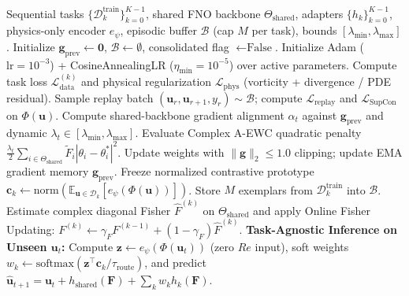 \documentclass[11pt,a4paper]{article}
\begin{document}
\begin{algorithm}[!htbp]
\caption{MEWC-Flow Continual Learning \& Task-Agnostic Inference}
\label{alg:mewcflow}
\begin{algorithmic}[1]
\REQUIRE Sequential tasks $\{\mathcal{D}_k^{\text{train}}\}_{k=0}^{K-1}$, shared FNO backbone $\Theta_{\text{shared}}$, adapters $\{h_k\}_{k=0}^{K-1}$, physics-only encoder $e_{\psi}$, episodic buffer $\mathcal{B}$ (cap $M$ per task), bounds $[\lambda_{\min}, \lambda_{\max}]$.
\STATE Initialize $\mathbf{g}_{\text{prev}} \gets \mathbf{0}$, $\mathcal{B} \gets \emptyset$, consolidated flag $\gets \text{False}$.
  \STATE Initialize Adam ($\text{lr}=10^{-3}$) + CosineAnnealingLR ($\eta_{\min}=10^{-5}$) over active parameters.
    \STATE Compute task loss $\mathcal{L}_{\text{data}}^{(k)}$ and physical regularization $\mathcal{L}_{\text{phys}}$ (vorticity + divergence / PDE residual).
      \STATE Sample replay batch $(\mathbf{u}_r, \mathbf{u}_{r+1}, y_r) \sim \mathcal{B}$; compute $\mathcal{L}_{\text{replay}}$ and $\mathcal{L}_{\text{SupCon}}$ on $\Phi(\mathbf{u})$.
      \STATE Compute shared-backbone gradient alignment $\alpha_t$ against $\mathbf{g}_{\text{prev}}$ and dynamic $\lambda_t \in [\lambda_{\min}, \lambda_{\max}]$.
      \STATE Evaluate Complex A-EWC quadratic penalty $\frac{\lambda_t}{2}\sum_{i\in\Theta_{\text{shared}}} \tilde{F}_i |\theta_i - \theta_i^*|^2$.
    \ENDIF
    \STATE Update weights with $\|\mathbf{g}\|_2 \le 1.0$ clipping; update EMA gradient memory $\mathbf{g}_{\text{prev}}$.
  \ENDFOR
  \STATE Freeze normalized contrastive prototype $\mathbf{c}_k \gets \text{norm}(\mathbb{E}_{\mathbf{u}\in\mathcal{D}_k}[e_{\psi}(\Phi(\mathbf{u}))])$.
  \STATE Store $M$ exemplars from $\mathcal{D}_k^{\text{train}}$ into $\mathcal{B}$.
  \STATE Estimate complex diagonal Fisher $\hat{F}^{(k)}$ on $\Theta_{\text{shared}}$ and apply Online Fisher Updating: $F^{(k)} \gets \gamma_F F^{(k-1)} + (1-\gamma_F)\hat{F}^{(k)}$.
\ENDFOR
\STATE \textbf{Task-Agnostic Inference on Unseen $\mathbf{u}_t$:} Compute $\mathbf{z} \gets e_{\psi}(\Phi(\mathbf{u}_t))$ (zero $Re$ input), soft weights $w_k \gets \text{softmax}(\mathbf{z}^{\top}\mathbf{c}_k/\tau_{\text{route}})$, and predict $\hat{\mathbf{u}}_{t+1} = \mathbf{u}_t + h_{\text{shared}}(\mathbf{F}) + \sum_k w_k h_k(\mathbf{F})$.
\end{algorithmic}
\end{algorithm}
\end{document}
